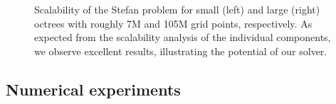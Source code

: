 \begin{figure}
\centering
{}
\caption{Scalability of the Stefan problem for small (left) and large (right) octrees with roughly 7M and 105M grid points, respectively. As expected from the scalability analysis of the individual components, we observe excellent results, illustrating the potential of our solver.}
\label{fig:stefan_scaling}
\end{figure}


\subsection{Numerical experiments}

\begin{figure}[ht!]
\begin{center}
\caption{} \label{fig:stefan_grid}
\end{center}
\end{figure}